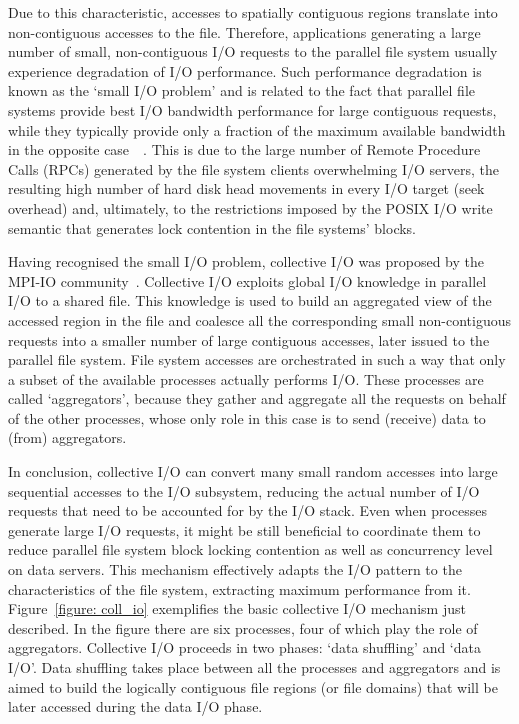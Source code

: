 Due to this characteristic, accesses to spatially contiguous regions translate into non-contiguous accesses to the file. Therefore, applications generating a large number of small, non-contiguous I/O requests to the parallel file system 
usually experience degradation of I/O performance. Such performance degradation is known as the `small I/O problem' and is related to the fact that parallel file systems provide best I/O bandwidth performance for large contiguous requests, 
while they typically provide only a fraction of the maximum available bandwidth in the opposite case~\cite{ChingCLP06}~\cite{HeSSYT11}. This is due to the large number of Remote Procedure Calls (RPCs) generated by the file system clients 
overwhelming I/O servers, the resulting high number of hard disk head movements in every I/O target (seek overhead) and, ultimately, to the restrictions imposed by the POSIX I/O write semantic that generates lock contention in the file 
systems' blocks.

Having recognised the small I/O problem, collective I/O was proposed by the MPI-IO community~\cite{ThakurGL99}. Collective I/O exploits global I/O knowledge in parallel I/O to a shared file. This knowledge is used to build an aggregated view 
of the accessed region in the file and coalesce all the corresponding small non-contiguous requests into a smaller number of large contiguous accesses, later issued to the parallel file system. File system accesses are orchestrated in such a 
way that only a subset of the available processes actually performs I/O. These processes are called `aggregators', because they gather and aggregate all the requests on behalf of the other processes, whose only role in this case is to send 
(receive) data to (from) aggregators.

In conclusion, collective I/O can convert many small random accesses into large sequential accesses to the I/O subsystem, reducing the actual number of I/O requests that need to be accounted for by the I/O stack. Even when processes generate 
large I/O requests, it might be still beneficial to coordinate them to reduce parallel file system block locking contention as well as concurrency level on data servers. This mechanism effectively adapts the I/O pattern to the characteristics 
of the file system, extracting maximum performance from it.
Figure~\ref{figure: coll_io} exemplifies the basic collective I/O mechanism just described. In the figure there are six processes, four of which play the role of aggregators. Collective I/O proceeds in two phases: `data shuffling' and `data I/O'. 
Data shuffling takes place between all the processes and aggregators and is aimed to build the logically contiguous file regions (or file domains) that will be later accessed during the data I/O phase.

